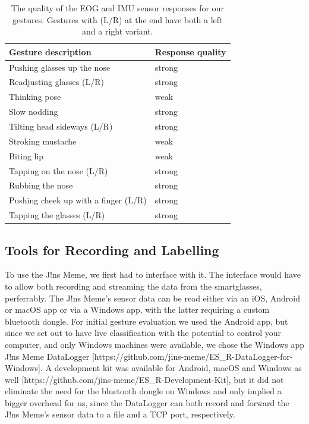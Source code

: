 \documentclass[runningheads]{llncs}
\begin{document}
\begin{table}
\caption{The quality of the EOG and IMU sensor responses for our gestures. Gestures 
        with (L/R) at the end have both a left and a right variant.}\label{tab:responses}
\begin{tabular}{|l|l|}
    \hline
    Gesture description & Response quality\\
    \hline
    Pushing glasses up the nose & strong\\
    Readjusting glasses (L/R)& strong\\
    Thinking pose & weak\\
    Slow nodding & strong\\
    Tilting head sideways (L/R)& strong\\
    Stroking mustache & weak\\
    Biting lip & weak\\
    Tapping on the nose (L/R)& strong\\
    Rubbing the nose & strong\\
    Pushing cheek up with a finger (L/R)& strong\\
    Tapping the glasses (L/R)& strong\\\hline
\end{tabular}
\end{table}

\subsection{Tools for Recording and Labelling}
To use the J!ns Meme, we first had to interface with it. The interface would have to allow
both recording and streaming the data from the smartglasses, perferrably.
The J!ns Meme's sensor data can be read either via an iOS, Android or macOS app
or via a Windows app, with the latter requiring a custom bluetooth dongle. For
initial gesture evaluation we used the Android app, but since we set out to have
live classification with the potential to control your computer, and only Windows
machines were available, we chose the Windows app J!ns Meme DataLogger
[https://github.com/jins-meme/ES\_R-DataLogger-for-Windows]. A development kit was
available for Android, macOS and Windows as well
[https://github.com/jins-meme/ES\_R-Development-Kit], but it did not eliminate the
need for the bluetooth dongle on Windows and only implied a bigger overhead for us,
since the DataLogger can both record and forward the J!ns Meme's sensor data to a
file and a TCP port, respectively.
\end{document}
